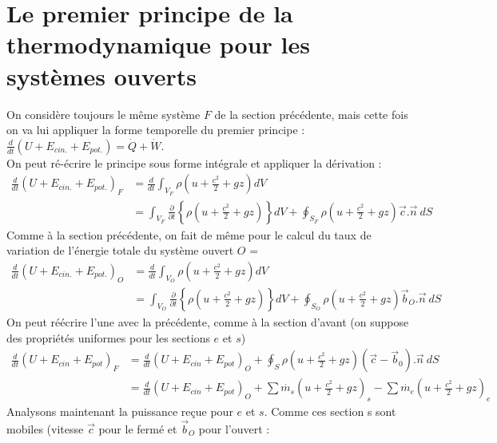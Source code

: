 \section{Le premier principe de la thermodynamique pour les systèmes 
ouverts}
On considère toujours le même système $F$ de la section précédente, mais 
cette fois on va lui appliquer la forme temporelle du premier principe :
$\frac{d}{dt}\left(U + E_{cin.} + E_{pot.}\right) = \dot{Q}+\dot{W}$. \\
On peut ré-écrire le principe sous forme intégrale et appliquer la 
dérivation :
\begin{equation}
\begin{split}
\frac{d}{dt}\left(U + E_{cin.} + E_{pot.}\right)_F &=
 \frac{d}{dt}\int_{V_F} \rho\left(u+\frac{c^2}{2}+gz\right)dV\\
& = \int_{V_F}\frac{\partial}{\partial t}\left\{\rho
\left(u+\frac{c^2}{2}+gz\right)\right\}dV + \oint_{S_F}\rho\left(u+\frac{
c^2}{2}+gz\right)\vec{c}.\vec{n}\ dS
\end{split}
\end{equation}
Comme à la section précédente, on fait de même pour le calcul du taux 
de variation de l'énergie totale du système ouvert $O$ = 
\begin{equation}
\begin{split}
\frac{d}{dt}\left(U + E_{cin.} + E_{pot.}\right)_O &=
 \frac{d}{dt}\int_{V_O} \rho\left(u+\frac{c^2}{2}+gz\right)dV\\
& = \int_{V_O}\frac{\partial}{\partial t}\left\{\rho
\left(u+\frac{c^2}{2}+gz\right)\right\}dV + \oint_{S_O}\rho\left(u+\frac{
c^2}{2}+gz\right)\vec{b}_O.\vec{n}\ dS
\end{split}
\end{equation}
On peut réécrire l'une avec la précédente, comme à la section d'avant (on 
suppose des propriétés uniformes pour les sections $e$ et $s$)
\begin{equation}
\begin{split}
\frac{d}{dt}\left(U+E_{cin}+E_{pot}\right)_F &= \frac{d}{dt}\left(U+E_{cin}+
E_{pot}\right)_O + \oint_S\rho\left(u+\frac{c^2}{2}+gz\right)(\vec{c}-\vec{b}_0)
.\vec{n}\ dS\\
&= \frac{d}{dt}\left(U+E_{cin}+E_{pot}\right)_O + \sum \dot{m_s}\left(
u+\frac{c^2}{2}+gz\right)_s -\sum \dot{m_e}\left(u+\frac{c^2}{2}+gz\right)_e
\end{split}
\end{equation}
Analysons maintenant la puissance reçue pour $e$ et $s$. Comme ces section s
sont mobiles (vitesse $\vec{c}$ pour le fermé et $\vec{b}_O$ pour l'ouvert :
